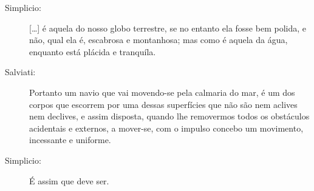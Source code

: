 \begin{description}
\item[Simplicio:] [\dots] é aquela do nosso globo terrestre, se no entanto ela fosse bem polida, e não, qual ela é, escabrosa e montanhosa; mas como é aquela da água, enquanto está plácida e tranquíla.

\item[Salviati:] Portanto um navio que vai movendo-se pela calmaria do mar, é um dos corpos que escorrem por uma dessas superfícies que não são nem aclives nem declives, e assim disposta, quando lhe removermos todos os obstáculos acidentais e externos, a mover-se, com o impulso concebo um movimento, incessante e uniforme.

\item[Simplicio:] É assim que deve ser.

\end{description}
